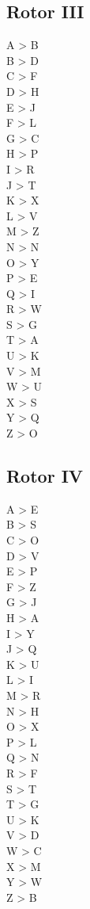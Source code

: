 \begin{multicols}{2}
\subsection{Rotor III}
A > B\\
B > D\\
C > F\\
D > H\\
E > J\\
F > L\\
G > C\\
H > P\\
I > R\\
J > T\\
K > X\\
L > V\\
M > Z\\
N > N\\
O > Y\\
P > E\\
Q > I\\
R > W\\
S > G\\
T > A\\
U > K\\
V > M\\
W > U\\
X > S\\
Y > Q\\
Z > O\\

\subsection{Rotor IV}
A > E\\
B > S\\
C > O\\
D > V\\
E > P\\
F > Z\\
G > J\\
H > A\\
I > Y\\
J > Q\\
K > U\\
L > I\\
M > R\\
N > H\\
O > X\\
P > L\\
Q > N\\
R > F\\
S > T\\
T > G\\
U > K\\
V > D\\
W > C\\
X > M\\
Y > W\\
Z > B\\


\end{multicols}
